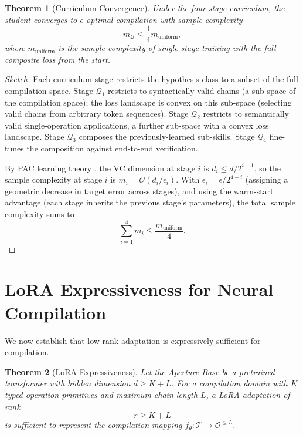 \documentclass[twocolumn,11pt,a4paper]{article}
\newtheorem{theorem}{Theorem}[section]
\newcommand{\cT}{\mathcal{T}}
\newcommand{\cO}{\mathcal{O}}
\newcommand{\cQ}{\mathcal{Q}}
\begin{document}
\begin{theorem}[Curriculum Convergence]
\label{thm:curriculum-convergence}
Under the four-stage curriculum, the student converges to $\epsilon$-optimal compilation with sample complexity
\begin{equation}
m_\cQ \leq \frac{1}{4} m_{\mathrm{uniform}},
\end{equation}
where $m_{\mathrm{uniform}}$ is the sample complexity of single-stage training with the full composite loss from the start.
\end{theorem}

\begin{proof}[Sketch]
Each curriculum stage restricts the hypothesis class to a subset of the full compilation space. Stage $\cQ_1$ restricts to syntactically valid chains (a sub-space of the compilation space); the loss landscape is convex on this sub-space (selecting valid chains from arbitrary token sequences). Stage $\cQ_2$ restricts to semantically valid single-operation applications, a further sub-space with a convex loss landscape. Stage $\cQ_3$ composes the previously-learned sub-skills. Stage $\cQ_4$ fine-tunes the composition against end-to-end verification.

By PAC learning theory \citep{shalev2014understanding}, the VC dimension at stage $i$ is $d_i \leq d/2^{i-1}$, so the sample complexity at stage $i$ is $m_i = \mathcal{O}(d_i/\epsilon_i)$. With $\epsilon_i = \epsilon/2^{4-i}$ (assigning a geometric decrease in target error across stages), and using the warm-start advantage (each stage inherits the previous stage's parameters), the total sample complexity sums to
\begin{equation}
\sum_{i=1}^4 m_i \leq \frac{m_{\mathrm{uniform}}}{4}.
\end{equation}
\end{proof}


\section{LoRA Expressiveness for Neural Compilation}
\label{sec:lora-expressiveness}

We now establish that low-rank adaptation is expressively sufficient for compilation.

\begin{theorem}[LoRA Expressiveness]
\label{thm:lora-expressiveness}
Let the Aperture Base be a pretrained transformer with hidden dimension $d \geq K + L$. For a compilation domain with $K$ typed operation primitives and maximum chain length $L$, a LoRA adaptation of rank
\begin{equation}
r \geq K + L
\end{equation}
is sufficient to represent the compilation mapping $f_\theta: \cT \to \cO^{\leq L}$.
\end{theorem}
\end{document}
